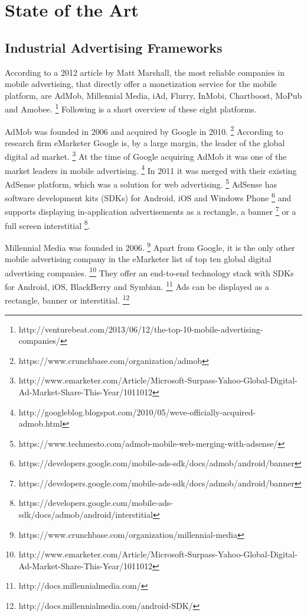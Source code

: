 \chapter{State of the Art}

\section{Industrial Advertising Frameworks}

According to a 2012 article by Matt Marshall, the most reliable companies in mobile advertising, that directly offer a monetization service for the mobile platform, are AdMob, Millennial Media, iAd, Flurry, InMobi, Chartboost, MoPub and Amobee. \footnote{http://venturebeat.com/2013/06/12/the-top-10-mobile-advertising-companies/} Following is a short overview of these eight platforms.

AdMob was founded in 2006 and acquired by Google in 2010. \footnote{https://www.crunchbase.com/organization/admob} According to research firm eMarketer Google is, by a large margin, the leader of the global digital ad market. \footnote{http://www.emarketer.com/Article/Microsoft-Surpass-Yahoo-Global-Digital-Ad-Market-Share-This-Year/1011012} At the time of Google acquiring AdMob it was one of the market leaders in mobile advertising. \footnote{http://googleblog.blogspot.com/2010/05/weve-officially-acquired-admob.html} In 2011 it was merged with their existing AdSense platform, which was a solution for web advertising. \footnote{https://www.techmesto.com/admob-mobile-web-merging-with-adsense/} AdSense has software development kits (SDKs) for Android, iOS and Windows Phone \footnote{https://developers.google.com/mobile-ads-sdk/docs/admob/android/banner}  and supports displaying in-application advertisements as a rectangle, a banner \footnote{https://developers.google.com/mobile-ads-sdk/docs/admob/android/banner}
or a full screen interstitial \footnote{https://developers.google.com/mobile-ads-sdk/docs/admob/android/interstitial}.

Millennial Media was founded in 2006. \footnote{https://www.crunchbase.com/organization/millennial-media} Apart from Google, it is the only other mobile advertising company in the eMarketer list of top ten global digital advertising companies. \footnote{http://www.emarketer.com/Article/Microsoft-Surpass-Yahoo-Global-Digital-Ad-Market-Share-This-Year/1011012} They offer an end-to-end technology stack with SDKs for Android, iOS, BlackBerry and Symbian. \footnote{http://docs.millennialmedia.com/} Ads can be displayed as a rectangle, banner or interstitial. \footnote{http://docs.millennialmedia.com/android-SDK/}

